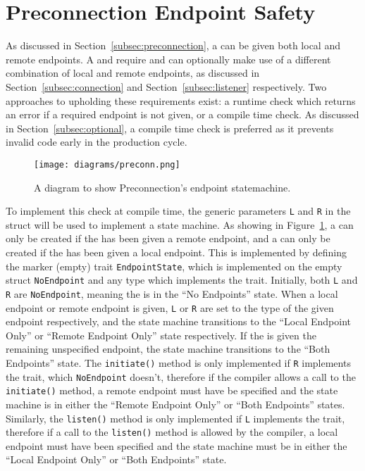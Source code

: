 \section{Preconnection Endpoint Safety}\label{sec:preconnection-endpoint-safety}
As discussed in Section~\ref{subsec:preconnection}, a \preconnection{} can be given both local and remote endpoints.
A \connection{} and \listener{} require and can optionally make use of a different combination of local
and remote endpoints, as discussed in Section~\ref{subsec:connection} and Section~\ref{subsec:listener} respectively.
Two approaches to upholding these requirements exist: a runtime check which returns an error if a required endpoint is
not given, or a compile time check.
As discussed in Section~\ref{subsec:optional}, a compile time check is preferred as it prevents invalid code early in
the production cycle.

\begin{figure}[h]
    \centering
    \texttt{[image: diagrams/preconn.png]}
    \caption{A diagram to show Preconnection's endpoint statemachine.}
    \label{fig:preconState}
\end{figure}

To implement this check at compile time, the generic parameters \texttt{L} and \texttt{R} in the \preconnection{} struct
will be used to implement a state machine.
As showing in Figure~\ref{fig:preconState}, a \connection{} can only be created if the \preconnection{} has been given
a remote endpoint, and a \listener{} can only be created if the \preconnection{} has been given a local endpoint.
This is implemented by defining the marker (empty) trait \texttt{EndpointState}, which is implemented on the empty
struct \texttt{NoEndpoint} and any type which implements the \Endpoint{} trait.
Initially, both \texttt{L} and \texttt{R} are \texttt{NoEndpoint}, meaning the \preconnection{} is in the “No Endpoints”
state.
When a local endpoint or remote endpoint is given, \texttt{L} or \texttt{R} are set to the type of the given endpoint
respectively, and the state machine transitions to the “Local Endpoint Only” or “Remote Endpoint Only” state
respectively.
If the \preconnection{} is given the remaining unspecified endpoint, the state machine transitions to the
“Both Endpoints” state.
The \texttt{initiate()} method is only implemented if \texttt{R} implements the \Endpoint{} trait, which
\texttt{NoEndpoint} doesn't, therefore if the compiler allows a call to the \texttt{initiate()} method, a remote
endpoint must have be specified and the state machine is in either the “Remote Endpoint Only” or “Both Endpoints”
states.
Similarly, the \texttt{listen()} method is only implemented if \texttt{L} implements the \Endpoint{} trait, therefore
if a call to the \texttt{listen()} method is allowed by the compiler, a local endpoint must have been specified and the
state machine must be in either the “Local Endpoint Only” or “Both Endpoints” state.

